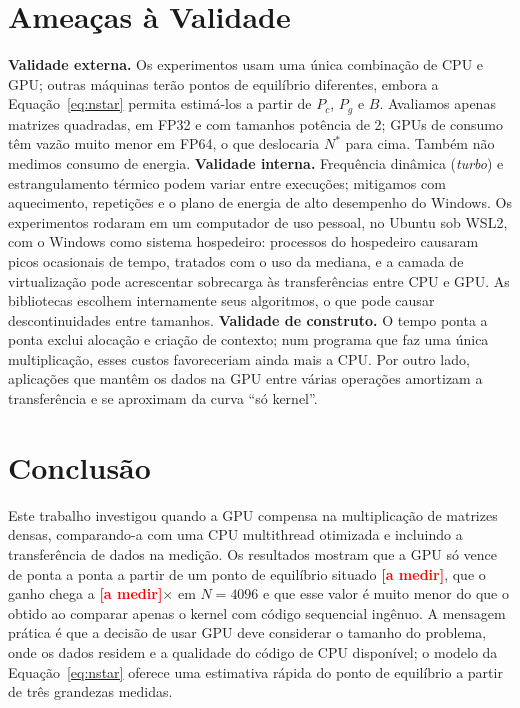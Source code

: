 \documentclass[12pt]{article}
\newcommand{\pendente}{\textbf{\textcolor{red}{[a medir]}}}
\newcommand{\breakeven}{\pendente}
\newcommand{\speedupEteMax}{\pendente}
\newcommand{\nMax}{4096}
\newif\ifrevisar \revisarfalse
\newcommand{\revisar}[1]{\ifrevisar{\color{orange!70!black}#1}\else#1\fi}
\begin{document}
\section{Ameaças à Validade}\label{sec:ameacas}

\textbf{Validade externa.} Os experimentos usam uma única combinação de CPU e
GPU; outras máquinas terão pontos de equilíbrio diferentes, embora a
Equação~\ref{eq:nstar} permita estimá-los a partir de $P_c$, $P_g$ e $B$.
Avaliamos apenas matrizes quadradas, em FP32 e com tamanhos potência de 2; GPUs
de consumo têm vazão muito menor em FP64, o que deslocaria $N^*$ para cima.
Também não medimos consumo de energia.
\textbf{Validade interna.} Frequência dinâmica (\emph{turbo}) e
estrangulamento térmico podem variar entre execuções; mitigamos com
aquecimento, repetições e o plano de energia de alto desempenho do
Windows. Os experimentos rodaram em um computador de uso pessoal, no Ubuntu sob
WSL2, com o Windows como sistema hospedeiro: processos do hospedeiro causaram
picos ocasionais de tempo, tratados com o uso da mediana, e a camada de
virtualização pode acrescentar sobrecarga às transferências entre CPU e GPU. As bibliotecas escolhem internamente seus algoritmos, o
que pode causar descontinuidades entre tamanhos.
\textbf{Validade de construto.} O tempo ponta a ponta exclui alocação e criação
de contexto; num programa que faz uma única multiplicação, esses custos
favoreceriam ainda mais a CPU. Por outro lado, aplicações que mantêm os dados
na GPU entre várias operações amortizam a transferência e se aproximam da
curva ``só kernel''.

\section{Conclusão}\label{sec:conclusao}

Este trabalho investigou quando a GPU compensa na multiplicação de matrizes
densas, comparando-a com uma CPU multithread otimizada e incluindo a
transferência de dados na medição. \revisar{Os resultados mostram que a GPU
só vence de ponta a ponta a partir de um ponto de equilíbrio situado
\breakeven, que o ganho chega a
\speedupEteMax$\times$ em $N=\nMax$ e que esse valor é muito menor do que o
obtido ao comparar apenas o kernel com código sequencial ingênuo.} A
mensagem prática é que a decisão de usar GPU deve considerar o tamanho do
problema, onde os dados residem e a qualidade do código de CPU disponível; o
modelo da Equação~\ref{eq:nstar} oferece uma estimativa rápida do ponto de
equilíbrio a partir de três grandezas medidas.
\end{document}
